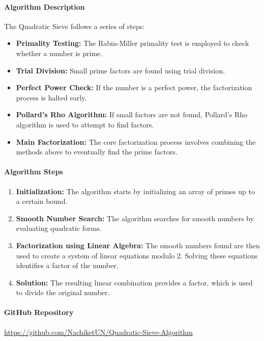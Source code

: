 \documentclass[12pt]{report}
\begin{document}
\paragraph{Algorithm Description}
The Quadratic Sieve follows a series of steps:
\begin{itemize}
    \item \textbf{Primality Testing:} The Rabin-Miller primality test is employed to check whether a number is prime.
    \item \textbf{Trial Division:} Small prime factors are found using trial division.
    \item \textbf{Perfect Power Check:} If the number is a perfect power, the factorization process is halted early.
    \item \textbf{Pollard's Rho Algorithm:} If small factors are not found, Pollard's Rho algorithm is used to attempt to find factors.
    \item \textbf{Main Factorization:} The core factorization process involves combining the methods above to eventually find the prime factors.
\end{itemize}

\paragraph{Algorithm Steps}

\begin{enumerate}
    \item \textbf{Initialization:} The algorithm starts by initializing an array of primes up to a certain bound.
    \item \textbf{Smooth Number Search:} The algorithm searches for smooth numbers by evaluating quadratic forms.
    \item \textbf{Factorization using Linear Algebra:} The smooth numbers found are then used to create a system of linear equations modulo 2. Solving these equations identifies a factor of the number.
    \item \textbf{Solution:} The resulting linear combination provides a factor, which is used to divide the original number.
\end{enumerate}

\paragraph{GitHub Repository}
\begin{center}
    \url{https://github.com/NachiketUN/Quadratic-Sieve-Algorithm}
\end{center}
\end{document}
